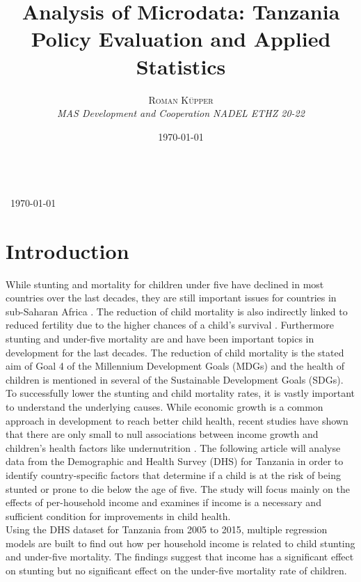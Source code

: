 \documentclass[a4paper, 11pt]{article} %
\title{\textbf{Analysis of Microdata: Tanzania}\\ %
Policy Evaluation and Applied Statistics } %
\author{\textsc{Roman Küpper} %
\\{\textit{MAS Development and Cooperation NADEL ETHZ 20-22}}} %
\date{\today} %
\makeatletter
\renewcommand{\maketitle}{ %
\begin{flushright} %
{\LARGE\@title} %
\vspace{50pt} %

{\large\@author} %
\\\ \today %

\vspace{40pt} %
\end{flushright}
}
\makeatother
\begin{document}
\maketitle %



\section{Introduction}
While stunting and mortality for children under five have declined in most countries over the last decades, they are still important issues for countries in sub-Saharan Africa \cite{Nshimyiryo2019Dec}. The reduction of child mortality is also indirectly linked to reduced fertility due to the higher chances of a child's survival \cite{uddin2009}. Furthermore stunting and under-five mortality are and have been important topics in development for the last decades. The reduction of child mortality is the stated aim of Goal 4 of the Millennium Development Goals (MDGs) and the health of children is mentioned in several of the Sustainable Development Goals (SDGs). To successfully lower the stunting and child mortality rates, it is vastly important to understand the underlying causes. While economic growth is a common approach in development to reach better child health, recent studies have shown that there are only small to null associations between income growth and children's health factors like undernutrition \cite{Vollmer2014Apr}. The following article will analyse data from the Demographic and Health Survey (DHS) for Tanzania in order to identify country-specific factors that determine if a child is at the risk of being stunted or prone to die below the age of five. The study will focus mainly on the effects of per-household income and examines if income is a necessary and sufficient condition for improvements in child health. \\

Using the DHS dataset for Tanzania from 2005 to 2015, multiple regression models are built to find out how per household income is related to child stunting and under-five mortality. The findings suggest that income has a significant effect on stunting but no significant effect on the under-five mortality rate of children. 
\end{document}

